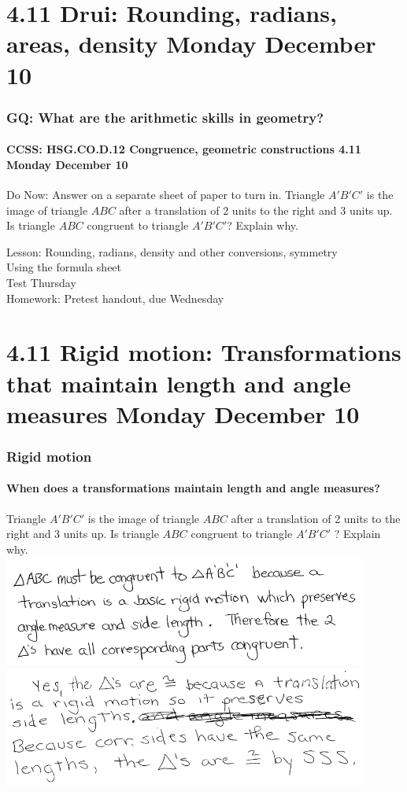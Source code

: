 \documentclass{beamer}
\begin{document}
  \section{4.11 Drui: Rounding, radians, areas, density Monday December 10}
    \frame
    {
      \frametitle{GQ: What are the arithmetic skills in geometry?}
      \framesubtitle{CCSS: HSG.CO.D.12 Congruence, geometric constructions  \alert{4.11 Monday December 10}}

      \begin{block}{Do Now: Answer on a separate sheet of paper to turn in.}
        Triangle $A'B'C'$ is the image of triangle $ABC$ after a translation of 2 units to the right and 3 units up. Is triangle $ABC$ congruent to triangle $A'B'C'$? Explain why.
      \end{block} \vspace{0.5cm}
      Lesson: Rounding, radians, density and other conversions, symmetry\\
      Using the formula sheet\\[0.5cm]
      \alert{Test Thursday} \\[0.5cm]
      Homework: Pretest handout, due Wednesday
    }

  \section{4.11 Rigid motion: Transformations that maintain length and angle measures Monday December 10}
    \frame
    {
      \frametitle{Rigid motion}
      \framesubtitle{When does a transformations maintain length and angle measures?}

      Triangle $A'B'C'$ is the image of triangle $ABC$ after a translation of 2 units to the right and 3 units up. Is triangle $ABC$ congruent to triangle $A'B'C'$ ? Explain why.\\[0.25cm]

      \pause \includegraphics[width=0.9\textwidth]{isometry_JN2018-25-sol.png}\\
      \pause \includegraphics[width=0.9\textwidth]{isometry_JN2018-25-sol2.png}
    }
\end{document}
